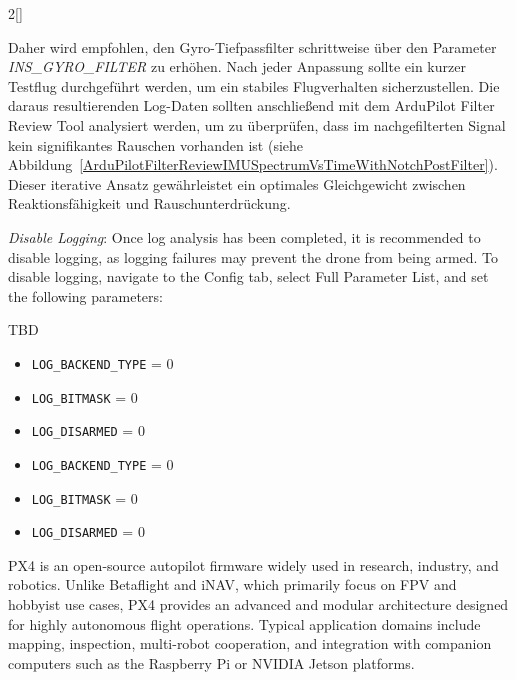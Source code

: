 \begin{paracol}{2}[]
\colger

Daher wird empfohlen, den Gyro-Tiefpassfilter schrittweise über den Parameter \textsl{INS\_GYRO\_FILTER} zu erhöhen. Nach jeder Anpassung sollte ein kurzer Testflug durchgeführt werden, um ein stabiles Flugverhalten sicherzustellen. Die daraus resultierenden Log-Daten sollten anschließend mit dem ArduPilot Filter Review Tool analysiert werden, um zu überprüfen, dass im nachgefilterten Signal kein signifikantes Rauschen vorhanden ist (siehe Abbildung~\ref{ArduPilotFilterReviewIMUSpectrumVsTimeWithNotchPostFilter}). Dieser iterative Ansatz gewährleistet ein optimales Gleichgewicht zwischen Reaktionsfähigkeit und Rauschunterdrückung.

\coleng

\textsl{Disable Logging}: Once log analysis has been completed, it is recommended to disable logging, as logging failures may prevent the drone from being armed. To disable logging, navigate to the Config tab, select Full Parameter List, and set the following parameters:

\colger

TBD

\coleng

\begin{itemize}
	\item \verb!LOG_BACKEND_TYPE! = 0
	\item \verb!LOG_BITMASK! = 0
	\item \verb!LOG_DISARMED! = 0
\end{itemize}

\colger

\begin{itemize}
	\item \verb!LOG_BACKEND_TYPE! = 0
	\item \verb!LOG_BITMASK! = 0
	\item \verb!LOG_DISARMED! = 0
\end{itemize}

\colende

\renewcommand{\deutschertitel}{PX4}
\renewcommand{\englischertitel}{PX4}
\makroabschnitt
\label{AbschnittPX4}

PX4 is an open-source autopilot firmware widely used in research, industry, and robotics. Unlike Betaflight and iNAV, which primarily focus on FPV and hobbyist use cases, PX4 provides an advanced and modular architecture designed for highly autonomous flight operations. Typical application domains include mapping, inspection, multi-robot cooperation, and integration with companion computers such as the Raspberry Pi or NVIDIA Jetson platforms. 


\end{paracol}
